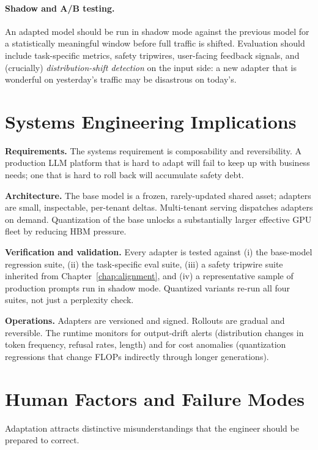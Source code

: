 \paragraph{Shadow and A/B testing.} An adapted model should be run
in shadow mode against the previous model for a statistically
meaningful window before full traffic is shifted. Evaluation should
include task-specific metrics, safety tripwires, user-facing
feedback signals, and (crucially) \emph{distribution-shift
detection} on the input side: a new adapter that is wonderful on
yesterday's traffic may be disastrous on today's.

\section{Systems Engineering Implications}

\textbf{Requirements.}
The systems requirement is composability and reversibility. A
production LLM platform that is hard to adapt will fail to keep up
with business needs; one that is hard to roll back will accumulate
safety debt.

\textbf{Architecture.}
The base model is a frozen, rarely-updated shared asset; adapters
are small, inspectable, per-tenant deltas. Multi-tenant serving
dispatches adapters on demand. Quantization of the base unlocks a
substantially larger effective GPU fleet by reducing HBM pressure.

\textbf{Verification and validation.}
Every adapter is tested against (i) the base-model regression suite,
(ii) the task-specific eval suite, (iii) a safety tripwire suite
inherited from Chapter~\ref{chap:alignment}, and (iv) a representative sample of
production prompts run in shadow mode. Quantized variants re-run all
four suites, not just a perplexity check.

\textbf{Operations.}
Adapters are versioned and signed. Rollouts are gradual and
reversible. The runtime monitors for output-drift alerts
(distribution changes in token frequency, refusal rates, length) and
for cost anomalies (quantization regressions that change FLOPs
indirectly through longer generations).

\section{Human Factors and Failure Modes}

Adaptation attracts distinctive misunderstandings that the engineer
should be prepared to correct.

